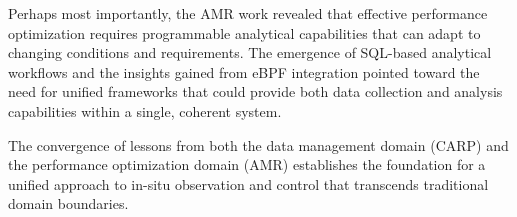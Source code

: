 Perhaps most importantly, the AMR work revealed that effective performance optimization requires
programmable analytical capabilities that can adapt to changing conditions and requirements.
The emergence of SQL-based analytical workflows and the insights gained from eBPF integration
pointed toward the need for unified frameworks that could provide both data collection and
analysis capabilities within a single, coherent system.

The convergence of lessons from both the data management domain (CARP) and the performance
optimization domain (AMR) establishes the foundation for a unified approach to in-situ
observation and control that transcends traditional domain boundaries. 